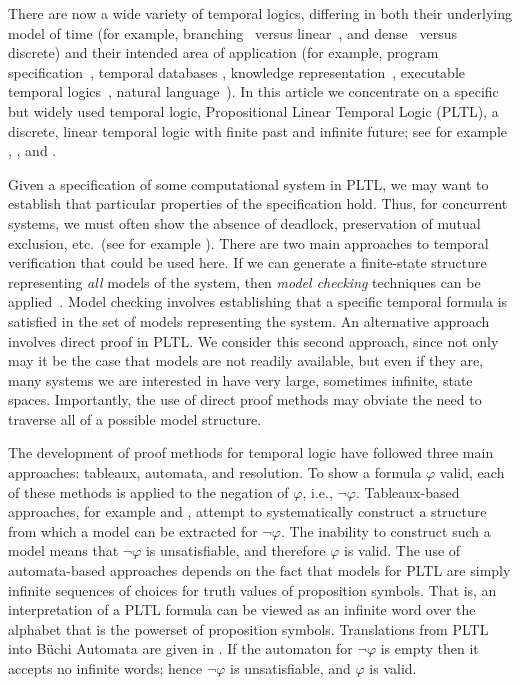 \documentclass[nohyperref]{acmtrans2f}
\begin{document}
There are now a wide variety of temporal logics, differing in both
their underlying model of time (for example,
branching~\cite{EmersonSrinivasan88} versus
linear~\cite{Pnu77,MannaPnueli92:book}, and
dense~\cite{BG85} versus discrete) and their intended area
of application (for example, program
specification~\cite{MannaPnueli92:book}, temporal databases
\cite{Tan93}, knowledge representation~\cite{AF99}, executable
temporal logics~\cite{BFGOR96:book}, natural
language~\cite{Steed97}). In this article we concentrate on a specific
but widely used temporal logic, Propositional Linear Temporal Logic (PLTL), a
discrete, linear temporal logic with finite past and infinite future;
see for example ,
, and
.

Given a specification of some computational system in PLTL, we may
want to establish that particular properties of the specification
hold. Thus, for concurrent systems, we must often show the absence of
deadlock, preservation of mutual exclusion, etc.\ (see for example
). There are two main approaches to temporal
verification that could be used here. If we can generate a
finite-state structure representing {\em all\/} models of the system,
then {\em model checking\/} techniques can be
applied~\cite{Holzmann97e}. Model checking involves establishing that
a specific temporal formula is satisfied in the set of models
representing the system. An alternative approach involves direct proof
in PLTL. We consider this second approach, since not only may it be the
case that models are not readily available, but even if they are, many
systems we are interested in have very large, sometimes infinite,
state spaces. Importantly, the use of direct proof methods may obviate
the need to traverse all of a possible model structure.

The development of proof methods for temporal logic have followed
three main approaches: tableaux, automata, and resolution. To show a
formula $\varphi$ valid, each of these methods is applied to the
negation of $\varphi$, i.e., $\neg \varphi$. Tableaux-based
approaches, for example  and , attempt to
systematically construct a structure from which a model can be
extracted for $\neg \varphi$. The inability to construct such a model
means that $\neg \varphi$ is unsatisfiable, and therefore $\varphi$ is
valid.  The use of automata-based approaches depends on the fact that
models for PLTL are simply infinite sequences of choices for truth
values of proposition symbols. That is, an interpretation of a PLTL formula
can be viewed as an infinite word over the alphabet that is the
powerset of proposition symbols. Translations from PLTL into B{\"u}chi
Automata are given in . If the automaton for $\neg
\varphi$ is empty then it accepts no infinite words; hence $\neg
\varphi$ is unsatisfiable, and $\varphi$ is valid.
\end{document}
